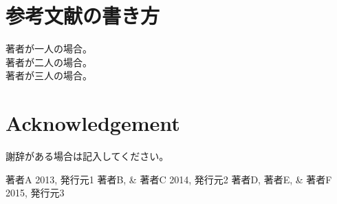 \documentclass[a4paper,10pt,oneside,twocolumn,notitlepage,final]{jarticle}
\begin{document}
\section{参考文献の書き方}
\noindent
著者が一人の場合\citep{ラベル1}。\\
著者が二人の場合\citep{ラベル2}。\\
著者が三人の場合\citep{ラベル3}。\\
\section*{Acknowledgement}
謝辞がある場合は記入してください。

\small
\begin{thebibliography}{99}
 著者A 2013, 発行元1
 著者B, \& 著者C 2014,  発行元2
 著者D, 著者E, \& 著者F 2015, 発行元3
 
 
\end{thebibliography}
\end{document}
